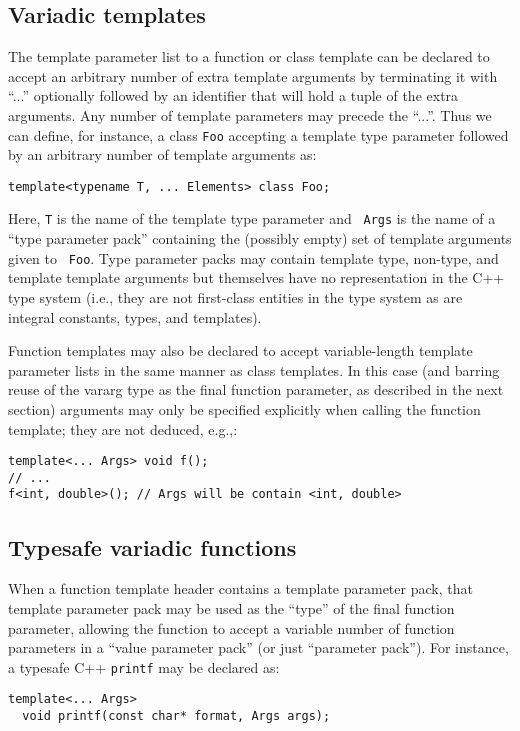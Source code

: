 \documentclass{article}
\begin{document}
\subsection{Variadic templates}
\par The template parameter list to a function or class template can
be declared to accept an arbitrary number of extra template arguments
by terminating it with ``...'' optionally followed by an identifier
that will hold a tuple of the extra arguments. Any number of template
parameters may precede the ``...''. Thus we can define, for instance,
a class {\tt Foo} accepting a template type parameter followed by an
arbitrary number of template arguments as:
\begin{verbatim}
template<typename T, ... Elements> class Foo;
\end{verbatim}

Here, {\tt T} is the name of the template type parameter and {\tt
  Args} is the name of a ``type parameter pack'' containing
the (possibly empty) set of template arguments given to {\tt
  Foo}. Type parameter packs may contain template type, non-type, and
template template arguments but themselves have no representation in
the C++ type system (i.e., they are not first-class entities in the
type system as are integral constants, types, and templates).

Function templates may also be declared to accept variable-length
template parameter lists in the same manner as class templates. In
this case (and barring reuse of the vararg type as the final function
parameter, as described in the next section) arguments may only be
specified explicitly when calling the function template; they are not
deduced, e.g.,:

\begin{verbatim}
template<... Args> void f();
// ... 
f<int, double>(); // Args will be contain <int, double>
\end{verbatim}

\subsection{Typesafe variadic functions}
When a function template header contains a template parameter pack,
that template parameter pack may be used as the ``type'' of the final
function parameter, allowing the function to accept a variable number
of function parameters in a ``value parameter pack'' (or just
``parameter pack''). For instance, a typesafe C++ {\tt printf} may
be declared as:
\begin{verbatim}
template<... Args>
  void printf(const char* format, Args args);
\end{verbatim}
\end{document}
